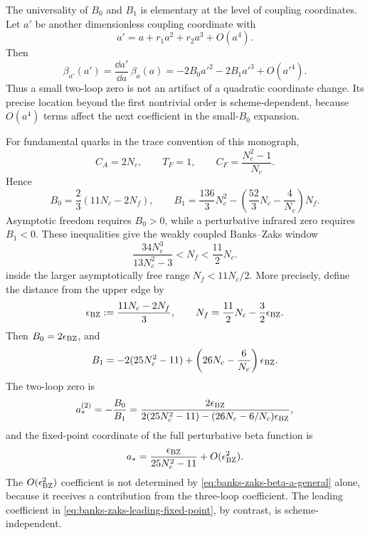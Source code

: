 The universality of \(B_0\) and \(B_1\) is elementary at the level of coupling
coordinates.  Let \(a'\) be another dimensionless coupling coordinate with
\[
  a'=a+r_1a^2+r_2a^3+O(a^4).
\]
Then
\[
  \beta_{a'}(a')
  =
  \frac{\dd a'}{\dd a}\,\beta_a(a)
  =
  -2B_0a'^2-2B_1a'^3+O(a'^4).
\]
Thus a small two-loop zero is not an artifact of a quadratic coordinate
change.  Its precise location beyond the first nontrivial order is
scheme-dependent, because \(O(a^4)\) terms affect the next coefficient in the
small-\(B_0\) expansion.

For fundamental quarks in the trace convention of this monograph,
\[
  C_A=2N_c,\qquad T_F=1,\qquad C_F=\frac{N_c^2-1}{N_c}.
\]
Hence
\begin{equation}
  B_0
  =
  \frac{2}{3}(11N_c-2N_f),
  \qquad
  B_1
  =
  \frac{136}{3}N_c^2
  -
  \left(\frac{52}{3}N_c-\frac4{N_c}\right)N_f .
  \label{eq:banks-zaks-fundamental-B0-B1}
\end{equation}
Asymptotic freedom requires \(B_0>0\), while a perturbative infrared zero
requires \(B_1<0\).  These inequalities give the weakly coupled Banks--Zaks
window
\begin{equation}
  \frac{34N_c^3}{13N_c^2-3}
  <
  N_f
  <
  \frac{11}{2}N_c .
  \label{eq:banks-zaks-window-core}
\end{equation}
inside the larger asymptotically free range \(N_f<11N_c/2\).  More precisely,
define the distance from the upper edge by
\begin{equation}
  \epsilon_{\rm BZ}
  :=
  \frac{11N_c-2N_f}{3},
  \qquad
  N_f=\frac{11}{2}N_c-\frac32\epsilon_{\rm BZ}.
  \label{eq:banks-zaks-epsilon}
\end{equation}
Then \(B_0=2\epsilon_{\rm BZ}\), and
\[
  B_1
  =
  -2(25N_c^2-11)
  +
  \left(26N_c-\frac6{N_c}\right)\epsilon_{\rm BZ}.
\]
The two-loop zero is
\begin{equation}
  a_*^{(2)}
  =
  -\frac{B_0}{B_1}
  =
  \frac{2\epsilon_{\rm BZ}}
       {2(25N_c^2-11)
        -(26N_c-6/N_c)\epsilon_{\rm BZ}},
  \label{eq:banks-zaks-two-loop-zero}
\end{equation}
and the fixed-point coordinate of the full perturbative beta function is
\begin{equation}
  a_*
  =
  \frac{\epsilon_{\rm BZ}}{25N_c^2-11}
  +O(\epsilon_{\rm BZ}^2).
  \label{eq:banks-zaks-leading-fixed-point}
\end{equation}
The \(O(\epsilon_{\rm BZ}^2)\) coefficient is not determined by
\eqref{eq:banks-zaks-beta-a-general} alone, because it receives a contribution
from the three-loop coefficient.  The leading coefficient in
\eqref{eq:banks-zaks-leading-fixed-point}, by contrast, is scheme-independent.

